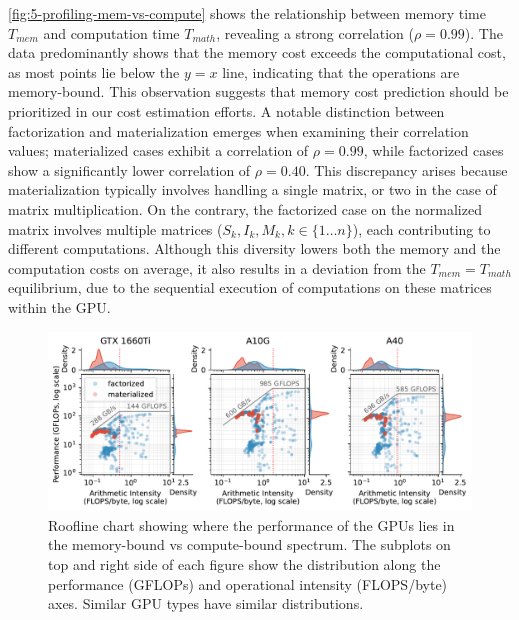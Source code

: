 \autoref{fig:5-profiling-mem-vs-compute} shows the relationship between memory time $T_{mem}$ and computation time $T_{math}$, revealing a strong correlation ($\rho = 0.99$). The data predominantly shows that the memory cost exceeds the computational cost, as most points lie below the $y=x$ line, indicating that the operations are memory-bound. This observation suggests that memory cost prediction should be prioritized in our cost estimation efforts. A notable distinction between factorization and materialization emerges when examining their correlation values; materialized cases exhibit a correlation of $\rho = 0.99$, while factorized cases show a significantly lower correlation of $\rho = 0.40$. This discrepancy arises because materialization typically involves handling a single matrix, or two in the case of matrix multiplication. On the contrary, the factorized case on the normalized matrix involves multiple matrices ($S_k,I_k,M_k, k \in \{1 \ldots n\}$), each contributing to different computations. Although this diversity lowers both the memory and the computation costs on average, it also results in a deviation from the $T_{mem} = T_{math}$ equilibrium, due to the sequential execution of computations on these matrices within the GPU.

\begin{figure}
    \centering
    \includegraphics[width=\linewidth]{chapters/05_cost_estimation/figures/roofline-plot.pdf}
    \caption[Roofline chart comparing F/M, per GPU]{Roofline chart showing where the performance of the GPUs lies in the memory-bound vs compute-bound spectrum. The subplots on top and right side of each figure show the distribution along the performance (GFLOPs) and operational intensity (FLOPS/byte) axes. Similar GPU types have similar distributions.}
    \label{fig:5-roofline-plot}
\end{figure}

